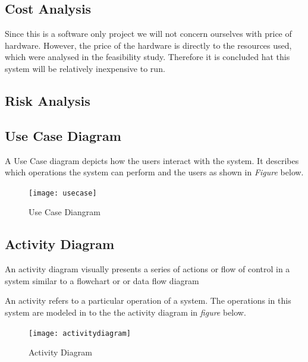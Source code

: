 \subsection{Cost Analysis}
Since this is a software only project we will not concern ourselves with price of hardware.  However, the price of the hardware is directly to the resources used, which were analysed in the feasibility study. Therefore it is concluded hat this system will be relatively inexpensive to run.

\subsection{Risk Analysis}

\subsection{Use Case Diagram}
A Use Case diagram depicts how the users interact with the system. It describes which operations the system can perform and the users as shown in \textit{Figure } below.

\begin{figure}[H]
	\centering
	\texttt{[image: usecase]}
	\caption[Use Case Diangram]{Use Case Diangram}
	\label{fig:usecase}
\end{figure}


\subsection{Activity Diagram}
An activity diagram visually presents a series of actions or flow of control in a system similar to a flowchart or or data flow diagram 

An activity refers to a particular operation of a system. The operations in this system are modeled in to the the activity diagram in \textit{figure } below.

\begin{figure}[H]
	\centering
	\texttt{[image: activitydiagram]}
	\caption[Activity Diagram]{Activity Diagram}
	\label{fig:activitydiagram}
\end{figure}


